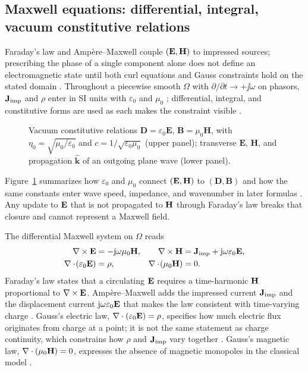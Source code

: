 \subsection{Maxwell equations: differential, integral, vacuum constitutive relations}
\label{sec:ch01.1.1}

Faraday's law and Amp\`ere--Maxwell couple $(\mathbf{E},\mathbf{H})$ to impressed sources; prescribing the phase of a single component alone does not define an electromagnetic state until both curl equations and Gauss constraints hold on the stated domain \cite{maxwell1873,stratton1941,jackson1999}. Throughout a piecewise smooth $\Omega$ with $\partial/\partial t\to +\jj\omega$ on phasors, $\mathbf{J}_{\mathrm{imp}}$ and $\rho$ enter in SI units with $\varepsilon_0$ and $\mu_0$ \cite{stratton1941,harrington2001}; differential, integral, and constitutive forms are used as each makes the constraint visible \cite{stratton1941}.

\begin{figure}[t]
\centering
\VolIPhysFig{\VolIPhysVacuumClosureMap}
\caption{Vacuum constitutive relations $\mathbf{D}=\varepsilon_0\mathbf{E}$, $\mathbf{B}=\mu_0\mathbf{H}$, with $\eta_0=\sqrt{\mu_0/\varepsilon_0}$ and $c=1/\sqrt{\varepsilon_0\mu_0}$ (upper panel); transverse $\mathbf{E}$, $\mathbf{H}$, and propagation $\hat{\mathbf{k}}$ of an outgoing plane wave (lower panel).}
\label{fig:ch1.vacuum-closure-map}
\end{figure}
Figure~\ref{fig:ch1.vacuum-closure-map} summarizes how $\varepsilon_0$ and $\mu_0$ connect $(\mathbf{E},\mathbf{H})$ to $(\mathbf{D},\mathbf{B})$ and how the same constants enter wave speed, impedance, and wavenumber in later formulas \cite{maxwell1873,stratton1941}. Any update to $\mathbf{E}$ that is not propagated to $\mathbf{H}$ through Faraday's law breaks that closure and cannot represent a Maxwell field.

The differential Maxwell system on $\Omega$ reads
\begin{equation}
\label{eq:ch1.maxwell-local}
\begin{aligned}
\nabla\times \mathbf{E}&=-\mathrm{j}\omega\mu_0\mathbf{H}, &
\nabla\times \mathbf{H}&=\mathbf{J}_{\mathrm{imp}}+\mathrm{j}\omega\varepsilon_0\mathbf{E},\\
\nabla\cdot\!\left(\varepsilon_0\mathbf{E}\right)&=\rho, &
\nabla\cdot\!\left(\mu_0\mathbf{H}\right)&=0.
\end{aligned}
\end{equation}
Faraday's law states that a circulating $\mathbf{E}$ requires a time-harmonic $\mathbf{H}$ proportional to $\nabla\times\mathbf{E}$. Amp\`ere--Maxwell adds the impressed current $\mathbf{J}_{\mathrm{imp}}$ and the displacement current $\mathrm{j}\omega\varepsilon_0\mathbf{E}$ that makes the law consistent with time-varying charge \cite{maxwell1873}. Gauss's electric law, $\nabla\cdot(\varepsilon_0\mathbf{E})=\rho$, specifies how much electric flux originates from charge at a point; it is not the same statement as charge continuity, which constrains how $\rho$ and $\mathbf{J}_{\mathrm{imp}}$ vary together \cite{stratton1941}. Gauss's magnetic law, $\nabla\cdot(\mu_0\mathbf{H})=0$, expresses the absence of magnetic monopoles in the classical model \cite{maxwell1873}.

